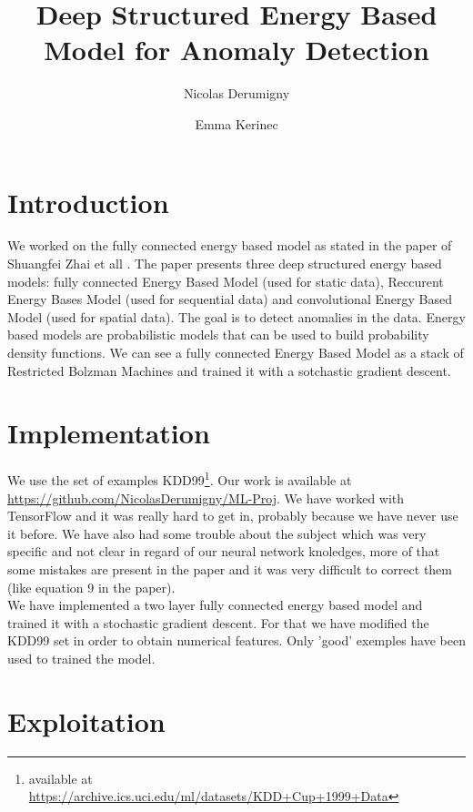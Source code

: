 \documentclass[a4paper]{article}
\title{Deep Structured Energy Based Model for Anomaly Detection}
\author{Nicolas Derumigny \and Emma Kerinec }
\begin{document}
\maketitle

\section{Introduction}
We worked on the fully connected energy based model as stated in the paper of Shuangfei Zhai et all \cite{DBLP:conf/icml/ZhaiCLZ16}.
The paper presents three deep structured energy based models: fully connected Energy Based Model (used for static data), Reccurent Energy Bases Model (used for sequential data) and convolutional Energy Based Model (used for spatial data). The goal is to detect anomalies in the data.
Energy based models are probabilistic models that can be used to build probability density functions. We can see a fully connected Energy Based Model as a stack of Restricted Bolzman Machines and trained it with a sotchastic gradient descent. 






\section{Implementation}
We use the set of examples KDD99\footnote{available at \url{https://archive.ics.uci.edu/ml/datasets/KDD+Cup+1999+Data}}. 
Our work is available at \url{https://github.com/NicolasDerumigny/ML-Proj}.
We have worked with TensorFlow and it was really hard to get in, probably because we have never use it before. 
We have also had some trouble about the subject which was very specific and not clear in regard of our neural network knoledges, more of that some mistakes are present in the paper and it was very difficult to correct them (like equation 9 in the paper).\\We have implemented a two layer fully connected energy based model and trained it with a stochastic gradient descent. For that we have modified the KDD99 set in order to obtain numerical features. Only 'good' exemples have been used to trained the model.


\section{Exploitation}






\newpage



\end{document}
